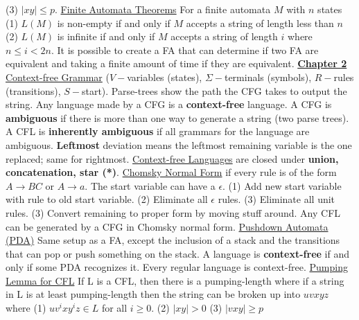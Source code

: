 \documentclass[9pt]{article}
\begin{document}
(3) $|xy| \leq p$.\newline
\uline{Finite Automata Theorems} For a finite automata $M$ with $n$ states (1) $L(M)$ 
is non-empty if and only if $M$ accepts a string of length less than $n$ (2) $L(M)$ is 
infinite if and only if $M$ accepts a string of length $i$ where $n\leq i < 2n$. It is
possible to create a FA that can determine if two FA are equivalent and taking a 
finite amount of time if they are equivalent.\newline
\noindent\uline{\textbf{Chapter 2}}\newline
\uline{Context-free Grammar} ($V-$variables (states), $\Sigma-$terminals (symbols), 
$R-$rules (transitions), $S-$start). Parse-trees show the path the CFG takes to output
the string. Any language made by a CFG is a \textbf{context-free} language. A CFG is
\textbf{ambiguous} if there is more than one way to generate a string (two parse trees). 
A CFL is \textbf{inherently ambiguous} if all grammars for the language are ambiguous. 
\textbf{Leftmost} deviation means the leftmost remaining variable is the one replaced; 
same for rightmost.\newline
\uline{Context-free Languages} are closed under \textbf{union, concatenation, star (*)}. \newline
\uline{Chomsky Normal Form} if every rule is of the form $A\rightarrow BC$ or 
$A\rightarrow a$. The start variable can have a $\epsilon$. (1) Add new start variable 
with rule to old start variable. (2) Eliminate all $\epsilon$ rules. (3) Eliminate all
unit rules. (3) Convert remaining to proper form by moving stuff around. Any CFL can be 
generated by a CFG in Chomsky normal form.\newline
\uline{Pushdown Automata (PDA)} Same setup as a FA, except the inclusion of a stack
and the transitions that can pop or push something on the stack. A language is 
\textbf{context-free} if and only if some PDA recognizes it. Every regular language is
context-free.\newline
\uline{Pumping Lemma for CFL} If L is a CFL, then there is a pumping-length where if
a string in L is at least pumping-length then the string can be broken up into $uvxyz$
where (1) $uv^ixy^iz \in L$ for all $i\geq 0$. (2) $|xy|>0$ (3) $|vxy|\geq p$\newline
\end{document}
